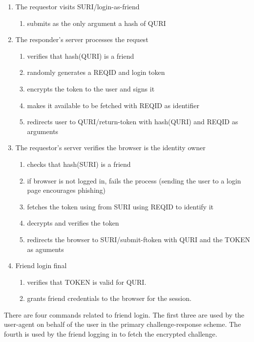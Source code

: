\documentclass[letterpaper,11pt,oneside]{article}
\begin{document}
\begin{enumerate}
\item The requestor visits SURI/login-as-friend
    \begin{enumerate}
    \item submits as the only argument a hash of QURI
    \end{enumerate}

\item The responder's server processes the request
    \begin{enumerate}
    \item verifies that hash(QURI) is a friend
    \item randomly generates a REQID and login token
    \item encrypts the token to the user and signs it
    \item makes it available to be fetched with REQID as identifier
    \item redirects user to QURI/return-token with hash(QURI) and REQID as
            arguments
    \end{enumerate}

\item The requestor's server verifies the browser is the identity owner
    \begin{enumerate}
    \item checks that hash(SURI) is a friend
    \item if browser is not logged in, fails the process
            (sending the user to a login page encourages phishing)
    \item fetches the token using from SURI using REQID to identify it
    \item decrypts and verifies the token
    \item redirects the browser to SURI/submit-ftoken with QURI and the TOKEN
            as aguments
    \end{enumerate}

\item Friend login final
    \begin{enumerate}
    \item verifies that TOKEN is valid for QURI.
    \item grants friend credentials to the browser for the session.
    \end{enumerate}
\end{enumerate}

There are four commands related to friend login. The first three are used by
the user-agent on behalf of the user in the primary challenge-response scheme.
The fourth is used by the friend logging in to fetch the encrypted challenge.
\end{document}
